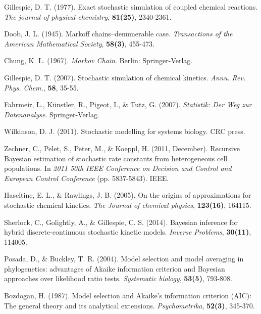 \documentclass{bioinfo}
\begin{document}
\begin{thebibliography}{}
Gillespie, D. T. (1977). Exact stochastic simulation of coupled chemical reactions. \textit{The journal of physical chemistry}, \textbf{81(25)}, 2340-2361.

Doob, J. L. (1945). Markoff chains--denumerable case. \textit{Transactions of the American Mathematical Society}, \textbf{58(3)}, 455-473.

Chung, K. L. (1967). \textit{Markov Chain}. Berlin: Springer-Verlag.

Gillespie, D. T. (2007). Stochastic simulation of chemical kinetics. \textit{Annu. Rev. Phys. Chem.}, \textbf{58}, 35-55.

Fahrmeir, L., K\"unstler, R., Pigeot, I., \& Tutz, G. (2007). \textit{Statistik: Der Weg zur Datenanalyse}. Springer-Verlag.

Wilkinson, D. J. (2011). Stochastic modelling for systems biology. CRC press.

Zechner, C., Pelet, S., Peter, M., \& Koeppl, H. (2011, December). Recursive Bayesian estimation of stochastic rate constants from heterogeneous cell populations. In \textit{2011 50th IEEE Conference on Decision and Control and European Control Conference} (pp. 5837-5843). IEEE.

Haseltine, E. L., \& Rawlings, J. B. (2005). On the origins of approximations for stochastic chemical kinetics. \textit{The Journal of chemical physics}, \textbf{123(16)}, 164115.

Sherlock, C., Golightly, A., \& Gillespie, C. S. (2014). Bayesian inference for hybrid discrete-continuous stochastic kinetic models. \textit{Inverse Problems}, \textbf{30(11)}, 114005.

Posada, D., \& Buckley, T. R. (2004). Model selection and model averaging in phylogenetics: advantages of Akaike information criterion and Bayesian approaches over likelihood ratio tests. \textit{Systematic biology}, \textbf{53(5)}, 793-808.

Bozdogan, H. (1987). Model selection and Akaike's information criterion (AIC): The general theory and its analytical extensions. \textit{Psychometrika}, \textbf{52(3)}, 345-370.


\end{thebibliography}
\end{document}
